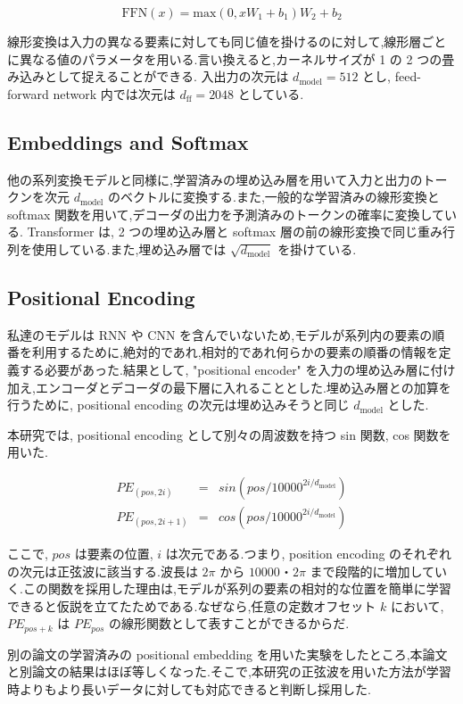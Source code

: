 \documentclass{jarticle}     %
\begin{document}
\begin{equation}
  \mathrm{FFN}(x) = \mathrm{max}(0,xW_\mathrm{1}+b_\mathrm{1})W_\mathrm{2} + b_\mathrm{2}
\end{equation}

線形変換は入力の異なる要素に対しても同じ値を掛けるのに対して,線形層ごとに異なる値のパラメータを用いる.言い換えると,カーネルサイズが 1 の 2 つの畳み込みとして捉えることができる.
入出力の次元は $d_\mathrm{model} = 512$ とし, feed-forward network 内では次元は $d_\mathrm{ff} = 2048$ としている.

\subsection{Embeddings and Softmax}
他の系列変換モデルと同様に,学習済みの埋め込み層を用いて入力と出力のトークンを次元 $d_\mathrm{model}$ のベクトルに変換する.また,一般的な学習済みの線形変換と softmax 関数を用いて,デコーダの出力を予測済みのトークンの確率に変換している. Transformer は, 2 つの埋め込み層と softmax 層の前の線形変換で同じ重み行列を使用している.また,埋め込み層では $\sqrt{d_\mathrm{model}}$ を掛けている.

\subsection{Positional Encoding}
私達のモデルは RNN や CNN を含んでいないため,モデルが系列内の要素の順番を利用するために,絶対的であれ,相対的であれ何らかの要素の順番の情報を定義する必要があった.結果として, "positional encoder" を入力の埋め込み層に付け加え,エンコーダとデコーダの最下層に入れることとした.埋め込み層との加算を行うために, positional encoding の次元は埋め込みそうと同じ $d_\mathrm{model}$ とした.\par
本研究では, positional encoding として別々の周波数を持つ sin 関数, cos 関数を用いた.

\begin{eqnarray*}
  PE_{(pos,2i)} &= &sin(pos/10000^{2i/d_\mathrm{model}}) \\
  PE_{(pos,2i+1)} &= &cos(pos/10000^{2i/d_\mathrm{model}})
\end{eqnarray*}

ここで, $pos$ は要素の位置, $i$ は次元である.つまり, position encoding のそれぞれの次元は正弦波に該当する.波長は $2\pi$ から $10000・2\pi$ まで段階的に増加していく.この関数を採用した理由は,モデルが系列の要素の相対的な位置を簡単に学習できると仮説を立てたためである.なぜなら,任意の定数オフセット $k$ において, $PE_{pos+k}$ は $PE_{pos}$ の線形関数として表すことができるからだ.\par
別の論文の学習済みの positional embedding を用いた実験をしたところ,本論文と別論文の結果はほぼ等しくなった.そこで,本研究の正弦波を用いた方法が学習時よりもより長いデータに対しても対応できると判断し採用した.
\end{document}
